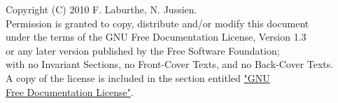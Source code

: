 \begin{myquote}
Copyright (C)  2010  F. Laburthe, N. Jussien.\\
Permission is granted to copy, distribute and/or modify this document\\
under the terms of the GNU Free Documentation License, Version 1.3\\
or any later version published by the Free Software Foundation;\\
with no Invariant Sections, no Front-Cover Texts, and no Back-Cover Texts.\\
A copy of the license is included in the section entitled \hyperlink{licence}{"GNU \\Free Documentation License"}.
\end{myquote}
